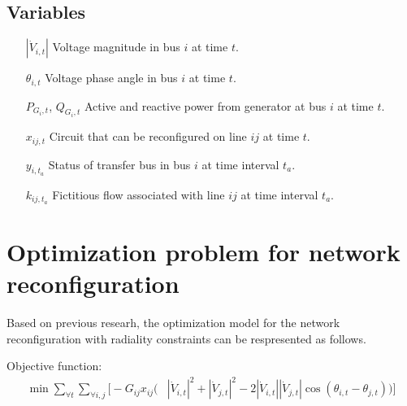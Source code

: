 \documentclass{article}
\begin{document}
\subsection*{Variables}
\begin{itemize}
\item[$\left|\dot{V}_{i,t} \right|$] Voltage magnitude in bus $i$ at time $t$.
\item[$\theta_{i,t}$] Voltage phase angle in bus $i$ at time $t$.
\item[$P_{G_{i},t}$, $Q_{G_{i},t}$] Active and reactive power from generator at bus $i$ at time $t$.
\item[$x_{ij,t}$] Circuit that can be reconfigured on line $ij$ at time $t$.
\item[$y_{i,t_{a}}$] Status of transfer bus in bus $i$ at time interval $t_{a}$.  
\item[$k_{ij,t_{a}}$] Fictitious flow associated with line $ij$ at time interval $t_{a}$.
\end{itemize}


\section{Optimization problem for network reconfiguration}
Based on previous researh, the optimization model for the network reconfiguration with radiality constraints can be respresented as follows\cite{5982115}.

Objective function:
\begin{equation}
  \begin{split}
  \min{} \sum_{\forall t}\sum_{\forall i,j}
  \bigl[-G_{ij}x_{ij} \bigl( & \left|\dot{V}_{i,t} \right|^2 + \left|\dot{V}_{j,t} \right|^2 - 2\left|\dot{V}_{i,t} \right|\left|\dot{V}_{j,t} \right|\cos\left(\theta_{i,t}-\theta_{j,t} \right) \bigr) \bigr]
  \end{split}
\label{eq:NR_obj}
\end{equation} 
\end{document}
